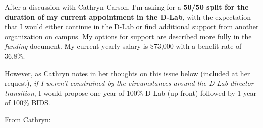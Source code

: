 




After a discussion with Cathryn Carson, I'm asking for a \textbf{50/50 split for
    the duration of my current appointment in the D-Lab}, with the expectation
that I would either continue in the D-Lab or find additional support from
another organization on campus. My options for support are described more fully
in the \emph{funding} document. My current yearly salary is \$73,000 with a
benefit rate of 36.8\%.

However, as Cathryn notes in her thoughts on this issue below (included at her
request), \emph{if I weren’t constrained by the circumstances around the D-Lab
director transition}, I would propose one year of 100\% D-Lab (up front) followed
by 1 year of 100\% BIDS.

\vspace{2ex}
\noindent
From Cathryn:

